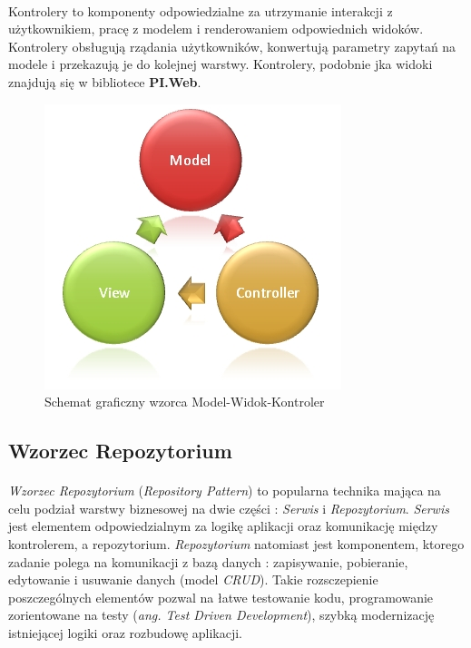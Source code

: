 \paragraph{} 
Kontrolery to komponenty odpowiedzialne za utrzymanie interakcji z użytkownikiem, pracę z modelem i renderowaniem odpowiednich widoków. Kontrolery obsługują rządania użytkowników, konwertują parametry zapytań na modele i przekazują je do kolejnej warstwy. Kontrolery, podobnie jka widoki znajdują się w bibliotece \textbf{PI.Web}.  

\newpage
\begin{figure}[ht]
	\centering
		\includegraphics[width=0.5\linewidth]{assets/03_1.jpg}
	\caption{Schemat graficzny wzorca Model-Widok-Kontroler}
	\label{fig:mvc-pic}
\end{figure}

\subsection{Wzorzec Repozytorium} %
\label{sub:wzorzec_repozytorium}
\paragraph{} %
\label{par:}
\textit{Wzorzec Repozytorium} (\textit{Repository Pattern}) to popularna technika mająca na celu podział warstwy biznesowej na dwie części : \textit{Serwis} i \textit{Repozytorium}. \textit{Serwis} jest elementem odpowiedzialnym za logikę aplikacji oraz komunikację między kontrolerem, a repozytorium. \textit{Repozytorium} natomiast jest komponentem, ktorego zadanie polega na komunikacji z bazą danych : zapisywanie, pobieranie, edytowanie i usuwanie danych (model \textit{CRUD}). Takie rozsczepienie poszczególnych elementów pozwal na łatwe testowanie kodu, programowanie zorientowane na testy (\textit{ang. Test Driven Development}), szybką modernizację istniejącej logiki oraz rozbudowę aplikacji.


